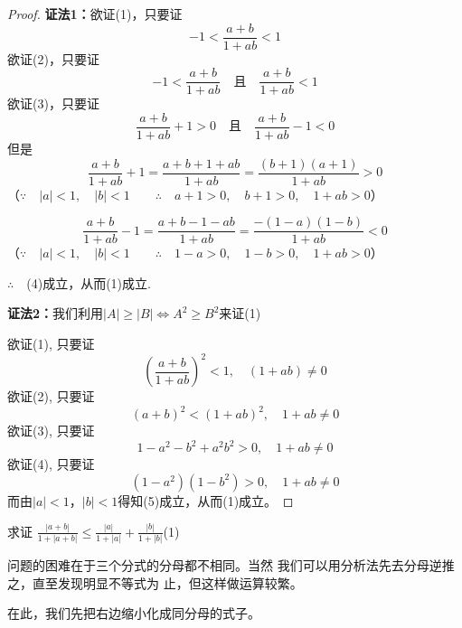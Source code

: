 \begin{proof}
\textbf{证法1：}欲证(1)，只要证    
\begin{equation}
    -1<\frac{a+b}{1+ab}<1 \tag{2}
\end{equation}
欲证(2)，只要证
\begin{equation}
-1<\frac{a+b}{1+ab}\quad \text{且}\quad \frac{a+b}{1+ab}<1  \tag{3}
\end{equation}
欲证(3)，只要证
\begin{equation}
\frac{a+b}{1+ab}+1>0 \quad \text{且}\quad \frac{a+b}{1+ab}-1<0  \tag{4}
\end{equation}
但是
\[ \frac{a+b}{1+ab}+1 = \frac{a+b+1+ab}{1+ab}=\frac{(b+1)(a+1)}{1+ab}>0\]
（$\because\quad |a|<1,\quad |b|<1\qquad \therefore\quad a+1>0,\quad b+1>0,\quad 1+ab>0$）

\[ \frac{a+b}{1+ab}-1 = \frac{a+b-1-ab}{1+ab}=\frac{-(1-a)(1-b)}{1+ab}<0\]
（$\because\quad |a|<1,\quad |b|<1\qquad \therefore\quad 1-a>0,\quad 1-b>0,\quad 1+ab>0$）

$\therefore\quad $(4)成立，从而(1)成立.

\textbf{证法2：}我们利用$|A|\ge |B|\Longleftrightarrow A^2\ge B^2$来证(1)

欲证(1), 只要证
\begin{equation}
\left(\frac{a+b}{1+ab}\right)^2<1,\quad (1+ab)\ne 0\tag{2}
\end{equation}
欲证(2), 只要证
\begin{equation}
   (a+b)^2<(1+ab)^2,\quad 1+ab\ne 0  \tag{3} 
\end{equation}
欲证(3), 只要证
\begin{equation}
1-a^2-b^2+a^2b^2>0,\quad 1+ab\ne 0  \tag{4} 
\end{equation}
欲证(4), 只要证
\begin{equation}
(1-a^2)(1-b^2)>0,\quad 1+ab\ne 0  \tag{5} 
\end{equation}
而由$|a|<1$，$|b|<1$得知(5)成立，从而(1)成立。
\end{proof}

\begin{example}
求证 $\frac{|a+b|}{1+|a+b|}\le \frac{|a|}{1+|a|}+\frac{|b|}{1+|b|}$\hfill (1)
\end{example}

\begin{analyze}
    问题的困难在于三个分式的分母都不相同。当然
我们可以用分析法先去分母逆推之，直至发现明显不等式为
止，但这样做运算较繁。

在此，我们先把右边缩小化成同分母的式子。
\end{analyze}

